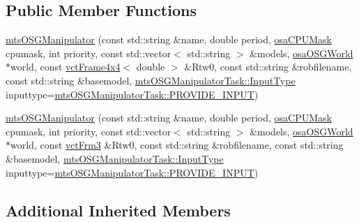 \subsection*{Public Member Functions}
\begin{DoxyCompactItemize}
\item 
\hyperlink{classmts_o_s_g_manipulator_ad0e556ae33153cc2c06804894bce948a}{mts\-O\-S\-G\-Manipulator} (const std\-::string \&name, double period, \hyperlink{osa_c_p_u_affinity_8h_aaec7cdd7797e5e6eb5438c15fee5477a}{osa\-C\-P\-U\-Mask} cpumask, int priority, const std\-::vector$<$ std\-::string $>$ \&models, \hyperlink{classosa_o_s_g_world}{osa\-O\-S\-G\-World} $\ast$world, const \hyperlink{classvct_frame4x4}{vct\-Frame4x4}$<$ double $>$ \&Rtw0, const std\-::string \&robfilename, const std\-::string \&basemodel, \hyperlink{classmts_o_s_g_manipulator_task_a176aa50980ddf34d1150514bb620cb8f}{mts\-O\-S\-G\-Manipulator\-Task\-::\-Input\-Type} inputtype=\hyperlink{classmts_o_s_g_manipulator_task_a176aa50980ddf34d1150514bb620cb8fa73f760c3f4b883d0ce1a241d172e626a}{mts\-O\-S\-G\-Manipulator\-Task\-::\-P\-R\-O\-V\-I\-D\-E\-\_\-\-I\-N\-P\-U\-T})
\item 
\hyperlink{classmts_o_s_g_manipulator_a5d858b4f653797b6945b87be39da8830}{mts\-O\-S\-G\-Manipulator} (const std\-::string \&name, double period, \hyperlink{osa_c_p_u_affinity_8h_aaec7cdd7797e5e6eb5438c15fee5477a}{osa\-C\-P\-U\-Mask} cpumask, int priority, const std\-::vector$<$ std\-::string $>$ \&models, \hyperlink{classosa_o_s_g_world}{osa\-O\-S\-G\-World} $\ast$world, const \hyperlink{vct_transformation_types_8h_a81feda0a02c2d1bc26e5553f409fed20}{vct\-Frm3} \&Rtw0, const std\-::string \&robfilename, const std\-::string \&basemodel, \hyperlink{classmts_o_s_g_manipulator_task_a176aa50980ddf34d1150514bb620cb8f}{mts\-O\-S\-G\-Manipulator\-Task\-::\-Input\-Type} inputtype=\hyperlink{classmts_o_s_g_manipulator_task_a176aa50980ddf34d1150514bb620cb8fa73f760c3f4b883d0ce1a241d172e626a}{mts\-O\-S\-G\-Manipulator\-Task\-::\-P\-R\-O\-V\-I\-D\-E\-\_\-\-I\-N\-P\-U\-T})
\end{DoxyCompactItemize}
\subsection*{Additional Inherited Members}


